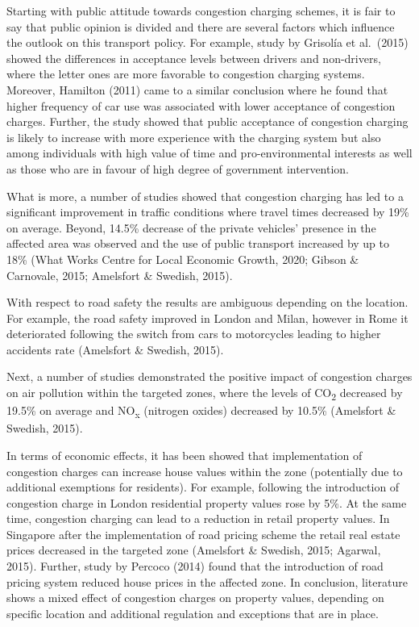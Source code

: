 \documentclass[
]{book}
\begin{document}
Starting with public attitude towards congestion charging schemes, it is fair to say that public opinion is divided and there are several factors which influence the outlook on this transport policy. For example, study by Grisolía et al.~(2015) showed the differences in acceptance levels between drivers and non-drivers, where the letter ones are more favorable to congestion charging systems. Moreover, Hamilton (2011) came to a similar conclusion where he found that higher frequency of car use was associated with lower acceptance of congestion charges. Further, the study showed that public acceptance of congestion charging is likely to increase with more experience with the charging system but also among individuals with high value of time and pro-environmental interests as well as those who are in favour of high degree of government intervention.

What is more, a number of studies showed that congestion charging has led to a significant improvement in traffic conditions where travel times decreased by 19\% on average. Beyond, 14.5\% decrease of the private vehicles' presence in the affected area was observed and the use of public transport increased by up to 18\% (What Works Centre for Local Economic Growth, 2020; Gibson \& Carnovale, 2015; Amelsfort \& Swedish, 2015).

With respect to road safety the results are ambiguous depending on the location. For example, the road safety improved in London and Milan, however in Rome it deteriorated following the switch from cars to motorcycles leading to higher accidents rate (Amelsfort \& Swedish, 2015).

Next, a number of studies demonstrated the positive impact of congestion charges on air pollution within the targeted zones, where the levels of CO\textsubscript{2} decreased by 19.5\% on average and NO\textsubscript{x} (nitrogen oxides) decreased by 10.5\% (Amelsfort \& Swedish, 2015).

In terms of economic effects, it has been showed that implementation of congestion charges can increase house values within the zone (potentially due to additional exemptions for residents). For example, following the introduction of congestion charge in London residential property values rose by 5\%. At the same time, congestion charging can lead to a reduction in retail property values. In Singapore after the implementation of road pricing scheme the retail real estate prices decreased in the targeted zone (Amelsfort \& Swedish, 2015; Agarwal, 2015). Further, study by Percoco (2014) found that the introduction of road pricing system reduced house prices in the affected zone. In conclusion, literature shows a mixed effect of congestion charges on property values, depending on specific location and additional regulation and exceptions that are in place.
\end{document}
